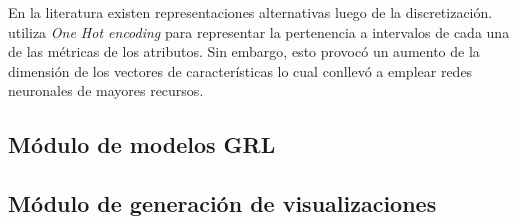 En la literatura existen representaciones alternativas luego de la discretizaci\'on. \cite{qian2020ml} 
utiliza \textit{One Hot encoding} para representar la pertenencia
a intervalos de cada una de las m\'etricas de los atributos. Sin embargo, esto provoc\'o un 
aumento de la dimensi\'on de los vectores de caracter\'isticas lo cual conllev\'o
a emplear redes neuronales de mayores recursos.

\subsection{M\'odulo de modelos GRL}

\subsection{M\'odulo de generaci\'on de visualizaciones}